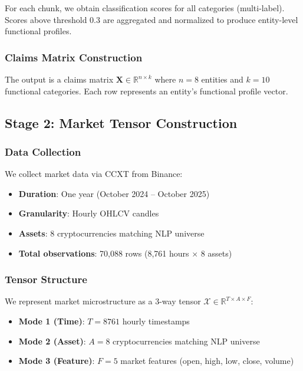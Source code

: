 \documentclass[11pt,twocolumn]{article}
\begin{document}
For each chunk, we obtain classification scores for all categories (multi-label). Scores above threshold 0.3 are aggregated and normalized to produce entity-level functional profiles.

\subsubsection{Claims Matrix Construction}

The output is a claims matrix $\mathbf{X} \in \mathbb{R}^{n \times k}$ where $n = 8$ entities and $k = 10$ functional categories. Each row represents an entity's functional profile vector.

\subsection{Stage 2: Market Tensor Construction}

\subsubsection{Data Collection}

We collect market data via CCXT from Binance:

\begin{itemize}[leftmargin=*]
    \item \textbf{Duration}: One year (October 2024 -- October 2025)
    \item \textbf{Granularity}: Hourly OHLCV candles
    \item \textbf{Assets}: 8 cryptocurrencies matching NLP universe
    \item \textbf{Total observations}: 70,088 rows (8,761 hours $\times$ 8 assets)
\end{itemize}

\subsubsection{Tensor Structure}

We represent market microstructure as a 3-way tensor $\mathcal{X} \in \mathbb{R}^{T \times A \times F}$:

\begin{itemize}[leftmargin=*]
    \item \textbf{Mode 1 (Time)}: $T = 8761$ hourly timestamps
    \item \textbf{Mode 2 (Asset)}: $A = 8$ cryptocurrencies matching NLP universe
    \item \textbf{Mode 3 (Feature)}: $F = 5$ market features (open, high, low, close, volume)
\end{itemize}
\end{document}
